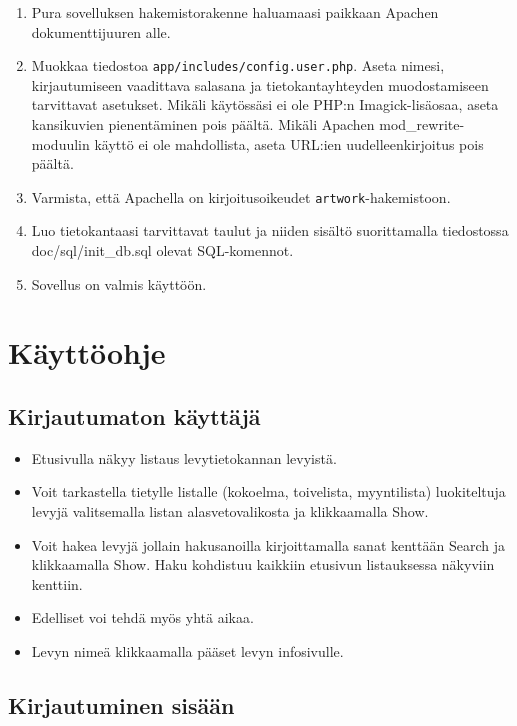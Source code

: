 \documentclass[a4paper,12pt]{report}
\begin{document}
\begin{enumerate}
  \item Pura sovelluksen hakemistorakenne haluamaasi paikkaan Apachen
    dokumenttijuuren alle.
  \item Muokkaa tiedostoa \texttt{app/includes/config.user.php}. Aseta
    nimesi, kirjautumiseen vaadittava salasana ja tietokantayhteyden
    muodostamiseen tarvittavat asetukset. Mikäli käytössäsi ei ole PHP:n
    Imagick-lisäosaa, aseta kansikuvien pienentäminen pois päältä. Mikäli
    Apachen mod\_rewrite-moduulin käyttö ei ole mahdollista, aseta URL:ien
    uudelleenkirjoitus pois päältä.
  \item Varmista, että Apachella on kirjoitusoikeudet
    \texttt{artwork}-hakemistoon.
  \item Luo tietokantaasi tarvittavat taulut ja niiden sisältö
    suorittamalla tiedostossa doc/sql/init\_db.sql olevat
    SQL-komennot.
  \item Sovellus on valmis käyttöön.
\end{enumerate}

\section{Käyttöohje}

\subsection{Kirjautumaton käyttäjä}

\begin{itemize}
  \item Etusivulla näkyy listaus levytietokannan levyistä.
  \item Voit tarkastella tietylle listalle (kokoelma, toivelista,
    myyntilista) luokiteltuja levyjä valitsemalla listan alasvetovalikosta
    ja klikkaamalla Show.
  \item Voit hakea levyjä jollain hakusanoilla kirjoittamalla sanat kenttään
    Search ja klikkaamalla Show. Haku kohdistuu kaikkiin etusivun
    listauksessa näkyviin kenttiin.
  \item Edelliset voi tehdä myös yhtä aikaa.
  \item Levyn nimeä klikkaamalla pääset levyn infosivulle.
\end{itemize}
	
\subsection{Kirjautuminen sisään}
\end{document}
